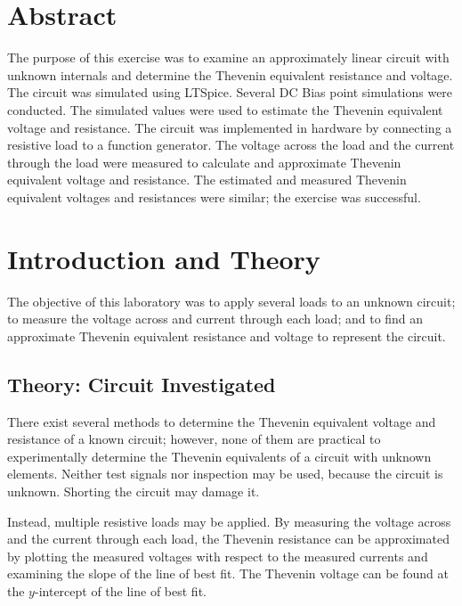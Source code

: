 \documentclass[EEEE]{KGCOEReport}
\begin{document}
\maketitle

\section*{Abstract}

The purpose of this exercise was to examine an approximately linear circuit
with unknown internals and determine the Thevenin equivalent resistance and
voltage. The circuit was simulated using LTSpice. Several DC Bias point
simulations were conducted. The simulated values were used to estimate the
Thevenin equivalent voltage and resistance. The circuit was implemented in
hardware by connecting a resistive load to a function generator. The voltage
across the load and the current through the load were measured to calculate
and approximate Thevenin equivalent voltage and resistance. The estimated and
measured Thevenin equivalent voltages and resistances were similar; the
exercise was successful.

\section{Introduction and Theory}

The objective of this laboratory was to apply several loads to an unknown
circuit; to measure the voltage across and current through each load; and to
find an approximate Thevenin equivalent resistance and voltage to represent
the circuit.

\subsection{Theory: Circuit Investigated}

There exist several methods to determine the Thevenin equivalent voltage and
resistance of a known circuit; however, none of them are practical to
experimentally determine the Thevenin equivalents of a circuit with unknown
elements. Neither test signals nor inspection may be used, because the circuit
is unknown. Shorting the circuit may damage it.

Instead, multiple resistive loads may be applied. By measuring the voltage
across and the current through each load, the Thevenin resistance can be
approximated by plotting the measured voltages with respect to the measured
currents and examining the slope of the line of best fit. The Thevenin voltage
can be found at the $y$-intercept of the line of best fit.
\end{document}
